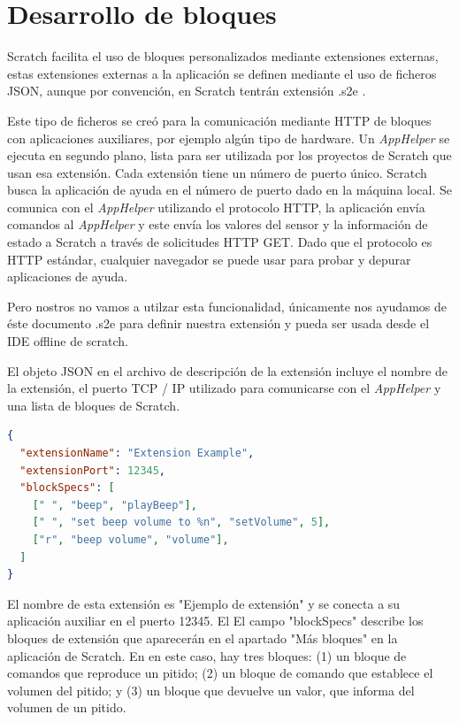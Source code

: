 \section{Desarrollo de bloques}
\label{sec:desarrollo-de-bloques}

Scratch facilita el uso de bloques personalizados mediante extensiones externas, estas  extensiones externas a la aplicación se definen mediante el uso de ficheros JSON, aunque por convención, en Scratch tentrán extensión .s2e .

Este tipo de ficheros se creó para la comunicación mediante HTTP de bloques con aplicaciones auxiliares, por ejemplo algún tipo de hardware.
Un \textit{AppHelper} se ejecuta en segundo plano, lista para ser utilizada por los proyectos de Scratch que usan esa extensión.
Cada extensión tiene un número de puerto único. Scratch busca la aplicación de ayuda en el número de puerto dado en la máquina local.
Se comunica con el \textit{AppHelper} utilizando el protocolo HTTP, la aplicación envía comandos al \textit{AppHelper} y este envía los valores del sensor y la información de estado a Scratch a través de solicitudes HTTP GET. Dado que el protocolo es HTTP estándar, cualquier navegador se puede usar para probar y depurar aplicaciones de ayuda.

Pero nostros no vamos a utilzar esta funcionalidad, únicamente nos ayudamos de éste documento .s2e para definir nuestra extensión y pueda ser usada desde el IDE offline de scratch.

El objeto JSON en el archivo de descripción de la extensión incluye el nombre de la extensión, el puerto TCP / IP utilizado para comunicarse con el \textit{AppHelper} y una lista de bloques de Scratch.
\begin{lstlisting}[language=json,firstnumber=1]
{ 
  "extensionName": "Extension Example",
  "extensionPort": 12345,
  "blockSpecs": [
    [" ", "beep", "playBeep"],
	[" ", "set beep volume to %n", "setVolume", 5],
	["r", "beep volume", "volume"],
  ]
}
\end{lstlisting}
El nombre de esta extensión es "Ejemplo de extensión" y se conecta a su aplicación auxiliar en el puerto 12345. El
El campo "blockSpecs" describe los bloques de extensión que aparecerán en el apartado "Más bloques" en la aplicación de Scratch.
En en este caso, hay tres bloques: (1) un bloque de comandos que reproduce un pitido; (2) un bloque de comando que
establece el volumen del pitido; y (3) un bloque que devuelve un valor, que informa del volumen de un pitido.


